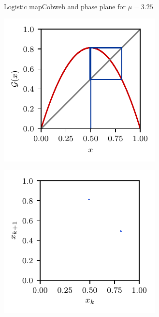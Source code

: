 \documentclass[usenames,dvipsnames,svgnames,10pt,aspectratio=169]{beamer}
\begin{document}
\begin{frame}[t, c]{Logistic map}{Cobweb and phase plane for $\mu = 3.25$}
	\begin{minipage}{.48\textwidth}
		\centering
		\includegraphics[width=.75\textwidth]{logistic_map_cobweb_plot_7}
	\end{minipage}%
	\begin{minipage}{.48\textwidth}
		\centering
		\includegraphics[width=.75\textwidth]{logistic_map_phase_plane_7}
	\end{minipage}

	\vspace{1cm}
\end{frame}
\end{document}
